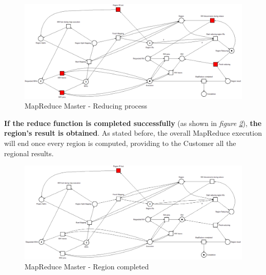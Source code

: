 \begin{figure}[!ht]
    \centering
    \includegraphics[width=\linewidth]{document/chapters/chapter_6/images/master_petri_net_4.png}
    \caption{MapReduce Master - Reducing process}
    \label{fig:master_petri_net_4}
\end{figure}

\textbf{If the reduce function is completed successfully} (as shown in \textit{figure \ref{fig:master_petri_net_5}}), \textbf{the region's result is obtained}. As stated before, the overall MapReduce execution will end once every region is computed, providing to the Customer all the regional results. 

\begin{figure}[!ht]
    \centering
    \includegraphics[width=\linewidth]{document/chapters/chapter_6/images/master_petri_net_5.png}
    \caption{MapReduce Master - Region completed}
    \label{fig:master_petri_net_5}
\end{figure}